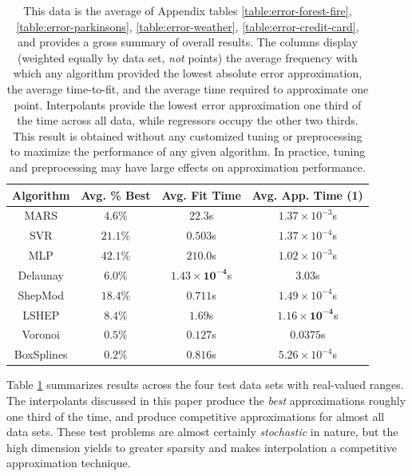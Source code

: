 \documentclass[smallextended,final]{svjour3}       %
\begin{document}
                                                                      
\begin{table}
  \centering
  \begin{tabular}{c|c|c|c}
    \hline
    Algorithm & Avg. \% Best & Avg. Fit Time & Avg. App. Time (1)\\
    \hline
    MARS & $4.6\%$ & $22.3$s & $1.37 \times 10^{-3}$s\\
    SVR & $\mathit{21.1}\%$ & $0.503$s & $\mathit{1.37 \times 10^{-4}}$s\\
    MLP & $\mathbf{42.1}\%$ & $210.0$s & $1.02 \times 10^{-3}$s\\
    Delaunay & $6.0\%$ & $\mathbf{1.43 \times 10^{-4}}$s & $3.03$s\\
    ShepMod & $18.4\%$ & $0.711$s & $1.49 \times 10^{-4}$s\\
    LSHEP & $8.4\%$ & $1.69$s & $\mathbf{1.16 \times 10^{-4}}$s\\
    Voronoi & $0.5\%$ & $\mathit{0.127}$s & $0.0375$s\\
    BoxSplines & $0.2\%$ & $0.816$s & $5.26 \times 10^{-4}$s\\
    \hline
  \end{tabular}
  \caption{This data is the average of Appendix tables
    \ref{table:error-forest-fire}, \ref{table:error-parkinsons},
    \ref{table:error-weather}, \ref{table:error-credit-card}, and
    provides a gross summary of overall results. The columns display
    (weighted equally by data set, \textit{not} points) the average
    frequency with which any algorithm provided the lowest absolute
    error approximation, the average time-to-fit, and the average time
    required to approximate one point. Interpolants provide the
    lowest error approximation one third of the time across all data,
    while regressors occupy the other two thirds. This result is
    obtained without any customized tuning or preprocessing to
    maximize the performance of any given algorithm. In practice,
    tuning and preprocessing may have large effects on approximation
    performance.}
  \label{table:avg-performance}
\end{table}

Table \ref{table:avg-performance} summarizes results across the four
test data sets with real-valued ranges. The interpolants discussed in
this paper produce the \textit{best} approximations roughly one third
of the time, and produce competitive approximations for almost all
data sets. These test problems are almost certainly
\textit{stochastic} in nature, but the high dimension yields to
greater sparsity and makes interpolation a competitive approximation
technique.
\end{document}
